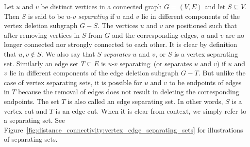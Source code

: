 Let $u$ and $v$ be distinct vertices in a connected graph $G = (V,E)$
and let $S \subseteq V$. Then $S$ is said to be $u$-$v$
\emph{separating} if $u$ and $v$ lie in different components of the
vertex deletion subgraph $G - S$. The vertices $u$ and $v$ are
positioned such that after removing vertices in $S$ from $G$ and the
corresponding edges, $u$ and $v$ are no longer connected nor strongly
connected to each other. It is clear by definition that
$u,v \notin S$. We also say that $S$ \emph{separates} $u$ and
$v$, or $S$ is a vertex separating set. Similarly an edge set
$T \subseteq E$ is $u$-$v$ separating~(or separates $u$ and $v$) if
$u$ and $v$ lie in different components of the edge deletion subgraph
$G - T$. But unlike the case of vertex separating sets, it is possible
for $u$ and $v$ to be endpoints of edges in $T$ because the removal of
edges does not result in deleting the corresponding endpoints. The set
$T$ is also called an edge separating set. In other words, $S$ is a
vertex cut and $T$ is an edge
cut. When it is clear from context, we simply refer to
a separating set. See
Figure~\ref{fig:distance_connectivity:vertex_edge_separating_sets} for
illustrations of separating sets.

